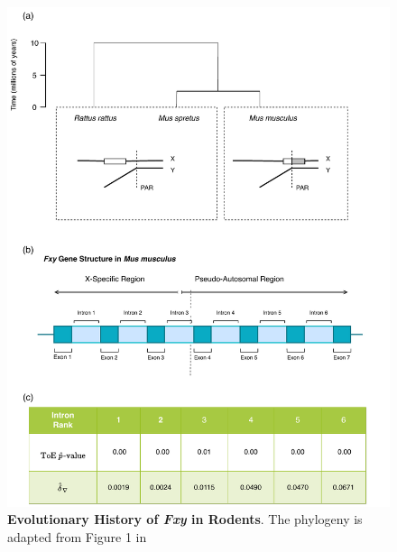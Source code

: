 \begin{figure}[htbp]
\centering
\includegraphics[width=\textwidth]{figures/diagrams/Fxy.pdf}
\caption{\textbf{Evolutionary History of \textit{Fxy} in Rodents}. The phylogeny is adapted from Figure 1 in \cite{Galtier2007AdaptationEvolution}}
\label{fig:Fxy}
\end{figure}